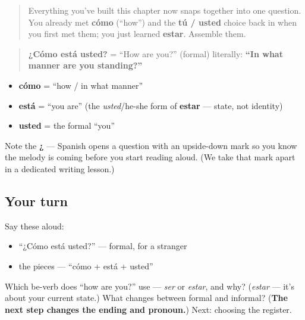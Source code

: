 \label{lesson:ES-C04-como-esta}



\begin{quote}
Everything you've built this chapter now snaps together into one question. You already met \textbf{cómo} (\textquotedblleft{}how\textquotedblright{}) and the \textbf{tú / usted} choice back in when you first met them; you just learned \textbf{estar}. Assemble them.
\end{quote}

\begin{cousinweb}
\begin{quote}
\textbf{¿Cómo está usted?} = \textquotedblleft{}How are you?\textquotedblright{} (formal) literally: \textbf{\textquotedblleft{}In what manner are you standing?\textquotedblright{}}
\end{quote}

\begin{itemize}
\raggedright
  \item \textbf{cómo} = \textquotedblleft{}how / in what manner\textquotedblright{}
  \item \textbf{está} = \textquotedblleft{}you are\textquotedblright{} (the \emph{usted}/he-she form of \textbf{estar} — state, not identity)
  \item \textbf{usted} = the formal \textquotedblleft{}you\textquotedblright{}
\end{itemize}

Note the \textbf{¿} — Spanish opens a question with an upside-down mark so you know the melody is coming before you start reading aloud. (We take that mark apart in a dedicated writing lesson.)
\end{cousinweb}

\subsection*{Your turn}
Say these aloud:

\begin{itemize}
\raggedright
  \item \textquotedblleft{}¿Cómo está usted?\textquotedblright{} — formal, for a stranger
  \item the pieces — \textquotedblleft{}cómo + está + usted\textquotedblright{}
\end{itemize}

\begin{tcolorbox}[breakable,colback=teal!4,colframe=teal!35!black,title={Before you move on}]
Which be-verb does \textquotedblleft{}how are you?\textquotedblright{} use — \emph{ser} or \emph{estar}, and why? (\emph{estar} — it's about your current state.) What changes between formal and informal? (\textbf{The next step changes the ending and pronoun.}) Next: choosing the register.
\end{tcolorbox}
